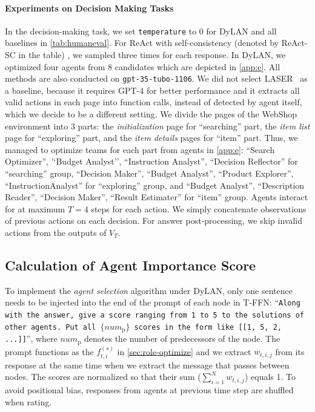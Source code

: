 \documentclass{article} %
\begin{document}
\paragraph{Experiments on Decision Making Tasks}

In the decision-making task, we set \texttt{temperature} to 0 for DyLAN and all baselines in \cref{tab:humaneval}. For ReAct with self-consistency (denoted by ReAct-SC in the table) \citep{wang2023selfconsistency}, we sampled three times for each response. In DyLAN, we optimized four agents from 8 candidates which are depicted in \cref{app:e}. All methods are also conducted on \texttt{gpt-35-tubo-1106}. 
We did not select LASER~\citep{ma2023laser} as a baseline, because it requires GPT-4 for better performance and it extracts all valid actions in each page into function calls, instead of detected by agent itself, which we decide to be a different setting. 
We divide the pages of the WebShop environment into 3 parts: the \textit{initialization} page for ``searching'' part, the \textit{item list} page for ``exploring'' part, and the \textit{item details} pages for ``item'' part. Thus, we managed to optimize teams for each part from agents in \cref{app:e}: ``Search Optimizer'', '`Budget Analyst'', ``Instruction Analyst'', ``Decision Reflector'' for ``searching'' group, ``Decision Maker'', ``Budget Analyst'', ``Product Explorer'', ``InstructionAnalyst'' for ``exploring'' group, and ``Budget Analyst'', ``Description Reader'', ``Decision Maker'', ``Result Estimater'' for ``item'' group. Agents interact for at maximum $T=4$ steps for each action. We simply concatenate observations of previous actions on each decision. For answer post-processing, we skip invalid actions from the outputs of $V_T$. 


\subsection{Calculation of Agent Importance Score}\label{app:imp}

To implement the \textit{agent selection} algorithm under DyLAN, only one sentence needs to be injected into the end of the prompt of each node in T-FFN: ``\texttt{Along with the answer, give a score ranging from 1 to 5 to the solutions of other agents. Put all $\{num_{\mathrm{p}}\}$ scores in the form like [[1, 5, 2, ...]]}'', where $num_{\mathrm{p}}$ denotes the number of predecessors of the node. The prompt functions as the $f_{t,i}^{(s)}$ in \cref{sec:role-optimize} and we extract $w_{t,i,j}$ from its response at the same time when we extract the message that passes between nodes. The scores are normalized so that their sum ($\sum_{i=1}^N w_{t,i,j}$) equals 1. To avoid positional bias, responses from agents at previous time step are shuffled when rating.
\end{document}
